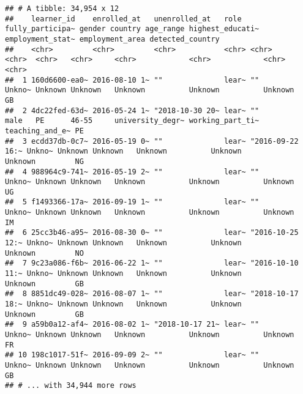 \documentclass[
]{article}
\begin{document}
\begin{verbatim}
## # A tibble: 34,954 x 12
##    learner_id    enrolled_at   unenrolled_at   role  fully_participa~ gender country age_range highest_educati~ employment_stat~ employment_area detected_country
##    <chr>         <chr>         <chr>           <chr> <chr>            <chr>  <chr>   <chr>     <chr>            <chr>            <chr>           <chr>           
##  1 160d6600-ea0~ 2016-08-10 1~ ""              lear~ ""               Unkno~ Unknown Unknown   Unknown          Unknown          Unknown         GB              
##  2 4dc22fed-63d~ 2016-05-24 1~ "2018-10-30 20~ lear~ ""               male   PE      46-55     university_degr~ working_part_ti~ teaching_and_e~ PE              
##  3 ecdd37db-0c7~ 2016-05-19 0~ ""              lear~ "2016-09-22 16:~ Unkno~ Unknown Unknown   Unknown          Unknown          Unknown         NG              
##  4 988964c9-741~ 2016-05-19 2~ ""              lear~ ""               Unkno~ Unknown Unknown   Unknown          Unknown          Unknown         UG              
##  5 f1493366-17a~ 2016-09-19 1~ ""              lear~ ""               Unkno~ Unknown Unknown   Unknown          Unknown          Unknown         IM              
##  6 25cc3b46-a95~ 2016-08-30 0~ ""              lear~ "2016-10-25 12:~ Unkno~ Unknown Unknown   Unknown          Unknown          Unknown         NO              
##  7 9c23a086-f6b~ 2016-06-22 1~ ""              lear~ "2016-10-10 11:~ Unkno~ Unknown Unknown   Unknown          Unknown          Unknown         GB              
##  8 8851dc49-028~ 2016-08-07 1~ ""              lear~ "2018-10-17 18:~ Unkno~ Unknown Unknown   Unknown          Unknown          Unknown         GB              
##  9 a59b0a12-af4~ 2016-08-02 1~ "2018-10-17 21~ lear~ ""               Unkno~ Unknown Unknown   Unknown          Unknown          Unknown         FR              
## 10 198c1017-51f~ 2016-09-09 2~ ""              lear~ ""               Unkno~ Unknown Unknown   Unknown          Unknown          Unknown         GB              
## # ... with 34,944 more rows
\end{verbatim}
\end{document}
